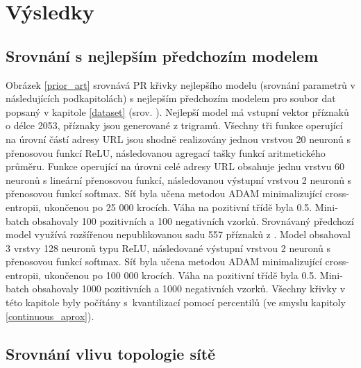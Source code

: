 \chapter{Výsledky}

\section{Srovnání s nejlepším předchozím modelem}\label{prior_art_comparison}
Obrázek \ref{prior_art} srovnává PR křivky nejlepšího modelu (srovnání parametrů v následujících podkapitolách) s nejlepším předchozím modelem pro soubor dat popsaný v kapitole \ref{dataset} (srov. \cite{machlica_learning_2017}). Nejlepší model má vstupní vektor příznaků o délce 2053, příznaky jsou generované z trigramů. Všechny tři funkce operující na úrovní částí adresy URL jsou shodně realizovány jednou vrstvou 20 neuronů s přenosovou funkcí ReLU, následovanou agregací tašky funkcí aritmetického průměru. Funkce operující na úrovni celé adresy URL obsahuje jednu vrstvu 60 neuronů s lineární přenosovou funkcí, následovanou výstupní vrstvou 2 neuronů s přenosovou funkcí softmax. Síť byla učena metodou ADAM minimalizující cross-entropii, ukončenou po 25 000 krocích. Váha na pozitivní třídě byla 0.5. Mini-batch obsahovaly 100 pozitivních a 100 negativních vzorků. Srovnávaný předchozí model využívá rozšířenou nepublikovanou sadu 557 příznaků z \cite{machlica_learning_2017}. Model obsahoval 3 vrstvy 128 neuronů typu ReLU, následované výstupní vrstvou 2 neuronů s přenosovou funkcí softmax. Síť byla učena metodou ADAM minimalizující cross-entropii, ukončenou po 100 000 krocích. Váha na pozitivní třídě byla 0.5. Mini-batch obsahovaly 1000 pozitivních a 1000 negativních vzorků. Všechny křivky v této kapitole byly počítány s~kvantilizací pomocí percentilů (ve smyslu kapitoly \ref{continuous_aprox}).


\section{Srovnání vlivu topologie sítě}

